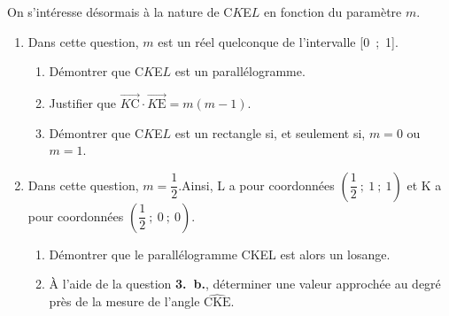\documentclass[10pt]{article}
\providecommand{\vect}[1]{\overrightarrow{#1}}
\begin{document}
On s'intéresse désormais à la nature de C$K$E$L$ en fonction du paramètre $m$.

\begin{enumerate}[resume]
\item Dans cette question, $m$ est un réel quelconque de l'intervalle [0~;~1].
	\begin{enumerate}
		\item Démontrer que C$K$E$L$ est un parallélogramme.
		\item Justifier que $\vect{K\text{C}} \cdot \vect{K\text{E}} = m(m - 1)$.
		\item Démontrer que C$K$E$L$ est un rectangle si, et seulement si, $m = 0$ ou $m = 1$.
	\end{enumerate}
\item Dans cette question, $m = \dfrac12$.Ainsi, L a pour coordonnées 
$\left(\dfrac12~;~1~;~1\right)$ et K a pour coordonnées $\left(\dfrac12~;~0~;~0\right)$.
	\begin{enumerate}
		\item Démontrer que le parallélogramme CKEL est alors un losange.
		\item À l'aide de la question \textbf{3.~b.}, déterminer une valeur approchée au degré près de la mesure de l'angle $\widehat{\text{CKE}}$.
	\end{enumerate}
\end{enumerate}
\end{document}

